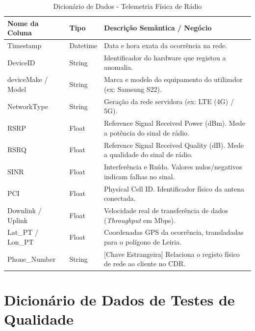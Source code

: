 \documentclass[runningheads]{llncs}
\begin{document}
\begin{table}[ht]
\centering
\caption{Dicionário de Dados - Telemetria Física de Rádio}
\renewcommand{\arraystretch}{1.2}
\begin{tabularx}{\textwidth}{@{}l l X@{}}
\toprule
\textbf{Nome da Coluna} & \textbf{Tipo} & \textbf{Descrição Semântica / Negócio} \\
\midrule
Timestamp & Datetime & Data e hora exata da ocorrência na rede. \\
DeviceID & String & Identificador do hardware que registou a anomalia. \\
deviceMake / Model & String & Marca e modelo do equipamento do utilizador (ex: Samsung S22). \\
NetworkType & String & Geração da rede servidora (ex: LTE (4G) / 5G). \\
RSRP & Float & Reference Signal Received Power (dBm). Mede a potência do sinal de rádio. \\
RSRQ & Float & Reference Signal Received Quality (dB). Mede a qualidade do sinal de rádio. \\
SINR & Float & Interferência e Ruído. Valores nulos/negativos indicam falhas no sinal. \\
PCI & Float & Physical Cell ID. Identificador físico da antena conectada. \\
Downlink / Uplink & Float & Velocidade real de transferência de dados (\textit{Throughput} em Mbps). \\
Lat\_PT / Lon\_PT & Float & Coordenadas GPS da ocorrência, transladadas para o polígono de Leiria. \\
Phone\_Number & String & [Chave Estrangeira] Relaciona o registo físico de rede ao cliente no CDR. \\
\bottomrule
\end{tabularx}
\end{table}

\clearpage

\section{Dicionário de Dados de Testes de Qualidade}
\label{anexo:dic_testes}
\end{document}

